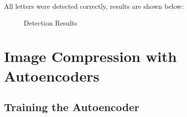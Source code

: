 \documentclass[11pt]{article} \usepackage{fullpage} \usepackage{graphicx} \usepackage{epstopdf} \usepackage{color} \usepackage{psfrag} \usepackage{pdfsync}\usepackage{indentfirst}\usepackage{subfigure}\usepackage{float}\usepackage[section]{placeins}
\begin{document}
All letters were detected correctly, results are shown below:
\begin{figure}[H]
\centering
{}
\caption{Detection Results}
\end{figure}

\section{Image Compression with Autoencoders}

\setcounter{subsection}{1}
\subsection{Training the Autoencoder}
\end{document}

